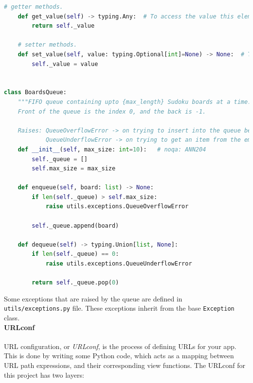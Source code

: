 \documentclass[12pt, a4paper]{report}
\newcommand{\code}[1]{\colorbox{light-gray}{\texttt{#1}}}
\begin{document}
\begin{lstlisting}[language=Python, caption=utils/classes.py]
    # getter methods.
    def get_value(self) -> typing.Any:  # To access the value this element has.
        return self._value

    # setter methods.
    def set_value(self, value: typing.Optional[int]=None) -> None:  # To access the value this element will have.
        self._value = value


class BoardsQueue:
    """FIFO queue containing upto {max_length} Sudoku boards at a time.
    Front of the queue is the index 0, and the back is -1.
    
    Raises: QueueOverflowError -> on trying to insert into the queue beyond it's specified max_size
            QueueUnderflowError -> on trying to get an item from the empty queue."""
    def __init__(self, max_size: int=10):   # noqa: ANN204
        self._queue = []
        self.max_size = max_size

    def enqueue(self, board: list) -> None:
        if len(self._queue) > self.max_size:
            raise utils.exceptions.QueueOverflowError
        
        self._queue.append(board)

    def dequeue(self) -> typing.Union[list, None]:
        if len(self._queue) == 0:
            raise utils.exceptions.QueueUnderflowError
        
        return self._queue.pop(0)
    \end{lstlisting}
    Some exceptions that are raised by the queue are defined in \texttt{utils/exceptions.py} file. These exceptions inherit from the base \code{Exception} class.\\
    \newline
    \textbf{URLconf}\\\\
    URL configuration, or \textit{URLconf}, is the process of defining URLs for your app. This is done by writing some Python code, which acts as a mapping between URL path expressions, and their corresponding view functions.
    The URLconf for this project has two layers:
\end{document}
